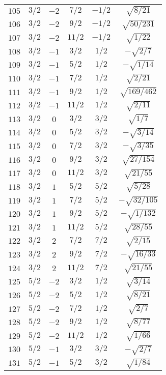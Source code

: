 \begin{table}
\begin{center}
\begin{tabular}{|c|c|c|c|c|c|}
$105$ & $3/2$ & $-2$ & $7/2$ & $-1/2$ & $\sqrt{8/21}$ \\ 
$106$ & $3/2$ & $-2$ & $9/2$ & $-1/2$ & $\sqrt{50/231}$ \\ 
$107$ & $3/2$ & $-2$ & $11/2$ & $-1/2$ & $\sqrt{1/22}$ \\ 
$108$ & $3/2$ & $-1$ & $3/2$ & $1/2$ & $-\sqrt{2/7}$ \\ 
$109$ & $3/2$ & $-1$ & $5/2$ & $1/2$ & $-\sqrt{1/14}$ \\ 
$110$ & $3/2$ & $-1$ & $7/2$ & $1/2$ & $\sqrt{2/21}$ \\ 
$111$ & $3/2$ & $-1$ & $9/2$ & $1/2$ & $\sqrt{169/462}$ \\ 
$112$ & $3/2$ & $-1$ & $11/2$ & $1/2$ & $\sqrt{2/11}$ \\ 
$113$ & $3/2$ & $0$ & $3/2$ & $3/2$ & $\sqrt{1/7}$ \\ 
$114$ & $3/2$ & $0$ & $5/2$ & $3/2$ & $-\sqrt{3/14}$ \\ 
$115$ & $3/2$ & $0$ & $7/2$ & $3/2$ & $-\sqrt{3/35}$ \\ 
$116$ & $3/2$ & $0$ & $9/2$ & $3/2$ & $\sqrt{27/154}$ \\ 
$117$ & $3/2$ & $0$ & $11/2$ & $3/2$ & $\sqrt{21/55}$ \\ 
$118$ & $3/2$ & $1$ & $5/2$ & $5/2$ & $\sqrt{5/28}$ \\ 
$119$ & $3/2$ & $1$ & $7/2$ & $5/2$ & $-\sqrt{32/105}$ \\ 
$120$ & $3/2$ & $1$ & $9/2$ & $5/2$ & $-\sqrt{1/132}$ \\ 
$121$ & $3/2$ & $1$ & $11/2$ & $5/2$ & $\sqrt{28/55}$ \\ 
$122$ & $3/2$ & $2$ & $7/2$ & $7/2$ & $\sqrt{2/15}$ \\ 
$123$ & $3/2$ & $2$ & $9/2$ & $7/2$ & $-\sqrt{16/33}$ \\ 
$124$ & $3/2$ & $2$ & $11/2$ & $7/2$ & $\sqrt{21/55}$ \\ 
$125$ & $5/2$ & $-2$ & $3/2$ & $1/2$ & $\sqrt{3/14}$ \\ 
$126$ & $5/2$ & $-2$ & $5/2$ & $1/2$ & $\sqrt{8/21}$ \\ 
$127$ & $5/2$ & $-2$ & $7/2$ & $1/2$ & $\sqrt{2/7}$ \\ 
$128$ & $5/2$ & $-2$ & $9/2$ & $1/2$ & $\sqrt{8/77}$ \\ 
$129$ & $5/2$ & $-2$ & $11/2$ & $1/2$ & $\sqrt{1/66}$ \\ 
$130$ & $5/2$ & $-1$ & $3/2$ & $3/2$ & $-\sqrt{2/7}$ \\ 
$131$ & $5/2$ & $-1$ & $5/2$ & $3/2$ & $\sqrt{1/84}$ \\ 

\end{tabular}
\end{center}
\end{table}
